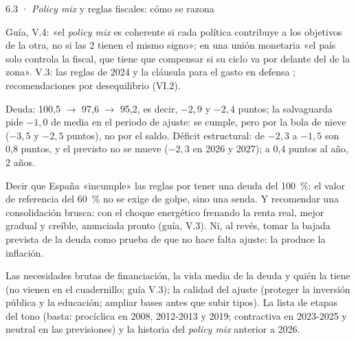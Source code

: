 \begin{complemento}{6.3 · \emph{Policy mix} y reglas fiscales: cómo se razona}
\begin{figuracaja}
\caption{Los 4 cuadrantes del \emph{policy mix} (infografía de la guía)}\label{fig:policy-mix}
\end{figuracaja}

 Guía, V.4: «el \emph{policy mix} es coherente si cada política contribuye a los objetivos de la otra, no si las 2 tienen el mismo signo»; en una unión monetaria «el país solo controla la fiscal, que tiene que compensar si su ciclo va por delante del de la zona». V.3: las reglas de 2024 \parencite{UE2024Reglamento1263,UE2024Reglamento1264} y la cláusula para el gasto en defensa \parencite{CE2025Defensa}; recomendaciones por desequilibrio (VI.2).

 Deuda: 100,5 $\to$ 97,6 $\to$ 95,2, es decir, $-2{,}9$ y $-2{,}4$ puntos; la salvaguarda pide $-1{,}0$ de media en el periodo de ajuste: se cumple, pero por la bola de nieve ($-3{,}5$ y $-2{,}5$ puntos), no por el saldo. Déficit estructural: de $-2{,}3$ a $-1{,}5$ son 0,8 puntos, y el previsto no se mueve ($-2{,}3$ en 2026 y 2027); a 0,4 puntos al año, 2 años.

 Decir que España «incumple» las reglas por tener una deuda del 100~\%: el valor de referencia del 60~\% no se exige de golpe, sino una senda. Y recomendar una consolidación brusca: con el choque energético frenando la renta real, mejor gradual y creíble, anunciada pronto (guía, V.3). Ni, al revés, tomar la bajada prevista de la deuda como prueba de que no hace falta ajuste: la produce la inflación.

 Las necesidades brutas de financiación, la vida media de la deuda y quién la tiene (no vienen en el cuadernillo; guía V.3); la calidad del ajuste (proteger la inversión pública y la educación; ampliar bases antes que subir tipos).  La lista de etapas del tono (basta: procíclica en 2008, 2012-2013 y 2019; contractiva en 2023-2025 y neutral en las previsiones) y la historia del \emph{policy mix} anterior a 2026.
\end{complemento}

